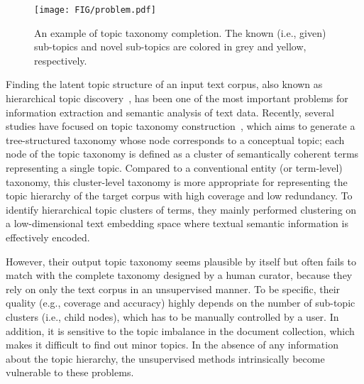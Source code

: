 \begin{figure}[t]
    \centering
    \texttt{[image: FIG/problem.pdf]}
    \caption{An example of topic taxonomy completion. The known (i.e., given) sub-topics and novel sub-topics are colored in grey and yellow, respectively.}
    \label{fig:problem}
\end{figure}

Finding the latent topic structure of an input text corpus, also known as hierarchical topic discovery~\cite{zhang2018taxogen, shang2020nettaxo, downey2015efficient, wang2013phrase, liu2012automatic}, has been one of the most important problems for information extraction and semantic analysis of text data.
Recently, several studies have focused on topic taxonomy construction~\cite{zhang2018taxogen,shang2020nettaxo}, which aims to generate a tree-structured taxonomy whose node corresponds to a conceptual topic;
each node of the topic taxonomy is defined as a cluster of semantically coherent terms representing a single topic.
Compared to a conventional entity (or term-level) taxonomy, this cluster-level taxonomy is more appropriate for representing the topic hierarchy of the target corpus with high coverage and low redundancy.
To identify hierarchical topic clusters of terms, they mainly performed clustering on a low-dimensional text embedding space where textual semantic information is effectively encoded.

However, their output topic taxonomy seems plausible by itself but often fails to match with the complete taxonomy designed by a human curator,
because they rely on only the text corpus in an unsupervised manner.
To be specific, their quality (e.g., coverage and accuracy) highly depends on the number of sub-topic clusters (i.e., child nodes), which has to be manually controlled by a user.
In addition, it is sensitive to the topic imbalance in the document collection, which makes it difficult to find out minor topics.
In the absence of any information about the topic hierarchy, the unsupervised methods intrinsically become vulnerable to these problems.

